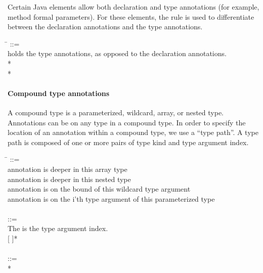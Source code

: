\documentclass{article}
\begin{document}
\noindent
Certain Java elements allow both declaration and type annotations (for example,
method formal parameters). For these elements, the 
rule is used to differentiate between the declaration annotations and the type
annotations.

\begin{tabbing}
\qquad \= \kill
{} ::= \\
\qquad    \bnfcmt holds the type annotations, as opposed to the declaration annotations. \\
\qquad        {} * \lineend \\
\qquad        {}*
\end{tabbing}


\paragraph{Compound type annotations}

A compound type is a parameterized, wildcard, array, or nested type. Annotations
can be on any type in a compound type. In order to specify the location of an
annotation within a compound type, we use a ``type path''. A
type path is composed of one or more pairs of type kind and type argument index.

\begin{tabbing}
\qquad \= \kill
{} ::= \\
\qquad    {} \bnfcmt annotation is deeper in this array type \\
\qquad    \bnfor{}  \bnfcmt annotation is deeper in this nested type \\
\qquad    \bnfor{}  \bnfcmt annotation is on the bound of this wildcard type argument \\
\qquad    \bnfor{}  \bnfcmt annotation is on the i'th type argument of this parameterized type \\
\\
 ::= \\
\qquad    \bnfcmt The  is the type argument index. \\
\qquad    {} \bnflit{,}  [ \bnflit{,}  \bnflit{,}  ]* \\
\\
 ::= \\
\qquad    {}  \bnflit{:} * \lineend
\end{tabbing}
\end{document}
